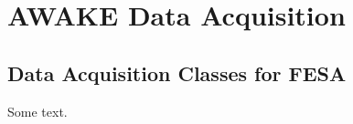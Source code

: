 %
%

\chapter{AWAKE Data Acquisition}
\label{Ch:DAQ}


\section{Data Acquisition Classes for FESA}
\label{Tools:FESA}

Some text.

